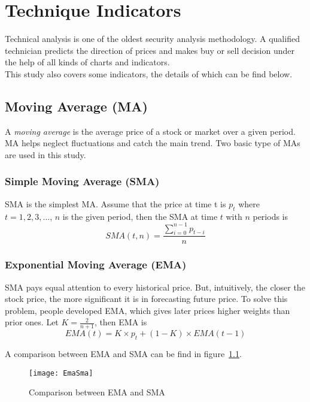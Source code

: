 \chapter{Technique Indicators}
\label{append:technical_indicator}

Technical analysis is one of the oldest security analysis methodology. A qualified technician predicts the direction of prices and makes buy or sell decision under the help of all kinds of charts and indicators.\\


This study also covers some indicators, the details of which can be find below.


\section{Moving Average (MA)\cite{kahn2006technical}}
A \textit{moving average} is the average price of a stock or market over a given period. MA helps neglect fluctuations and catch the main trend. Two basic type of MAs are used in this study.

\subsection{Simple Moving Average (SMA)}
SMA is the simplest MA. Assume that the price at time t is $ p_t $ where $t=1,2,3,\ldots$, $n$ is the given period, then the SMA at time $ t $ with $ n $ periods is
\begin{equation}
SMA(t, n)=\frac{\sum_{i=0}^{n-1}p_{t-i}}{n}
\end{equation}

\subsection{Exponential Moving Average (EMA)}  
SMA pays equal attention to every historical price. But, intuitively, the closer the stock price, the more significant it is in forecasting future price. To solve this problem, people developed EMA, which gives later prices higher weights than prior ones. Let $ K =\frac{2}{n+1} $, then EMA is 
\begin{equation}
EMA(t) = K\times p_t+(1-K) \times EMA(t-1)
\end{equation}

A comparison between EMA and SMA can be find in figure~\ref{fg:smaema}.
\begin{figure}[h]
	\centering
	\texttt{[image: EmaSma]}
	\caption{Comparison between EMA and SMA\cite{9_sma_ema}}
	\label{fg:smaema}
\end{figure}

